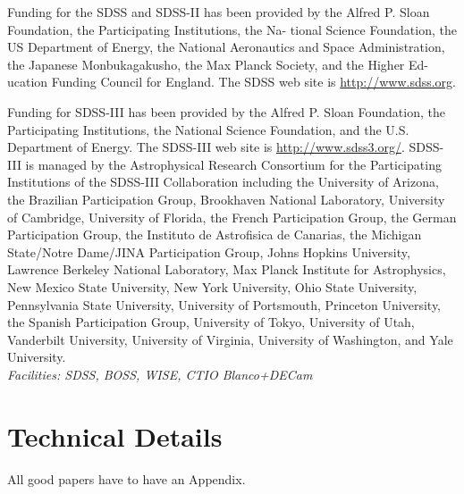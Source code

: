 \documentclass{emulateapj}
\begin{document}
Funding for the SDSS and SDSS-II has been provided by the Alfred
P. Sloan Foundation, the Participating Institutions, the Na- tional
Science Foundation, the US Department of Energy, the National
Aeronautics and Space Administration, the Japanese Monbukagakusho, the
Max Planck Society, and the Higher Ed- ucation Funding Council for
England. The SDSS web site is
\href{http://www.sdss.org/}{http://www.sdss.org}.

Funding for SDSS-III has been provided by the Alfred P. Sloan
Foundation, the Participating Institutions, the National Science
Foundation, and the U.S. Department of Energy. The SDSS-III web site
is \href{http://www.sdss3.org/}{http://www.sdss3.org/}.  SDSS-III is
managed by the Astrophysical Research Consortium for the Participating
Institutions of the SDSS-III Collaboration including the University of
Arizona, the Brazilian Participation Group, Brookhaven National
Laboratory, University of Cambridge, University of Florida, the French
Participation Group, the German Participation Group, the Instituto de
Astrofisica de Canarias, the Michigan State/Notre Dame/JINA
Participation Group, Johns Hopkins University, Lawrence Berkeley
National Laboratory, Max Planck Institute for Astrophysics, New Mexico
State University, New York University, Ohio State University,
Pennsylvania State University, University of Portsmouth, Princeton
University, the Spanish Participation Group, University of Tokyo,
University of Utah, Vanderbilt University, University of Virginia,
University of Washington, and Yale University.  \\ {\it Facilities:
SDSS, BOSS, WISE, CTIO Blanco+DECam}




\appendix
\section{Technical Details}
All good papers have to have an Appendix. 


 

\end{document}
